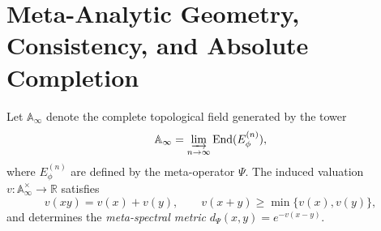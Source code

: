 
\section{Meta-Analytic Geometry, Consistency, and Absolute Completion}
\label{sec:vol2-part7-meta-geometry}\relax\hspace{0pt}

\begin{definition}\label{def:meta-field}
Let $\mathbb{A}_\infty$ denote the complete topological field generated by the tower
\[
\mathbb{A}_\infty
=\varinjlim_{n\to\infty}\mathrm{End}(E_\phi^{(n)}),
\]
where $E_\phi^{(n)}$ are defined by the meta-operator $\Psi$.
The induced valuation $v:\mathbb{A}_\infty^{\times}\to\mathbb{R}$ satisfies
\[
v(xy)=v(x)+v(y),\qquad v(x+y)\ge\min\{v(x),v(y)\},
\]
and determines the \emph{meta-spectral metric}
$d_\Psi(x,y)=e^{-v(x-y)}$.
\end{definition}

